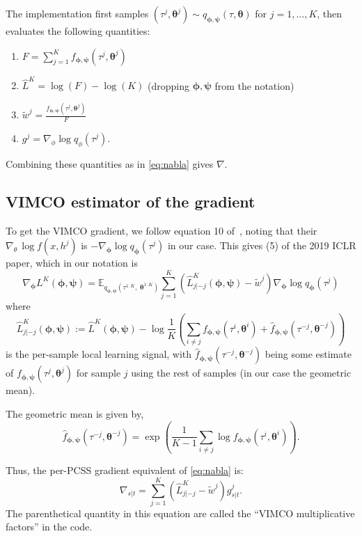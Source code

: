 \documentclass{article}
\newcommand{\bParam}{\bm{\theta}}
\begin{document}
The implementation first samples $(\tau^j, \bParam^j) \sim q_{\bm{\phi}, \bm{\psi}}(\tau, \bParam)$ for $j = 1, \ldots, K$, then evaluates the following quantities:
\begin{enumerate}
    \item $F = \sum_{j=1}^{K} f_{\bm{\phi},\bm{\psi}}(\tau^j, \bParam^j)$
    \item $\hat{L}^{K} = \log(F) - \log(K)$ (dropping $\bm{\phi}, \bm{\psi}$ from the notation)
    \item $\tilde{w}^j = \frac{f_{\bm{\phi},\bm{\psi}}(\tau^j, \bParam^j)}{F}$
    \item $g^j = \nabla_{\phi} \log q_{\phi}(\tau^j)$.
\end{enumerate}
Combining these quantities as in \eqref{eq:nabla} gives $\nabla$.

\subsection*{VIMCO estimator of the gradient}

To get the VIMCO gradient, we follow equation 10 of~\cite{Mnih2016-ec}, noting that their $\nabla_\theta \, \log f(x, h^j)$ is $-\nabla_{\bm{\phi}} \log q_{\bm{\phi}}(\tau^j)$ in our case.
This gives (5) of the 2019 ICLR paper, which in our notation is
\[
\nabla_{\bm{\phi}} L^K(\bm{\phi},{\bm{\psi}}) = \mathbb{E}_{q_{\bm{\phi},{\bm{\psi}}}(\tau^{1:K},\;\bm{\theta}^{1:K})}\sum_{j=1}^K\left(\hat{L}_{j|-j}^K(\bm{\phi},{\bm{\psi}})-\tilde{w}^j\right)\nabla_{\bm{\phi}}\log q_{\bm{\phi}}(\tau^j)
\]
where
\[
\hat{L}_{j|-j}^K(\bm{\phi},{\bm{\psi}}) :=  \hat{L}^K(\bm{\phi},{\bm{\psi}}) - \log\frac1K\left(\sum_{i\neq j}f_{\bm{\phi},{\bm{\psi}}}(\tau^i,\bm{\theta}^i) + \hat{f}_{\bm{\phi},{\bm{\psi}}}(\tau^{-j},\bm{\theta}^{-j})\right)
\]
is the per-sample local learning signal, with $\hat{f}_{\bm{\phi},{\bm{\psi}}}(\tau^{-j},\bm{\theta}^{-j})$ being some estimate of $f_{\bm{\phi},{\bm{\psi}}}(\tau^j,\bm{\theta}^j)$ for sample $j$ using the rest of samples (in our case the geometric mean).

The geometric mean is given by,
\begin{equation}\label{eq:f_hat}
    \hat{f}_{\bm{\phi}, \bm{\psi}}(\tau^{-j}, \bm{\theta}^{-j})  = \exp\left( \frac{1}{K-1} \sum_{i \not= j} \log f_{\bm{\phi}, \bm{\psi}}(\tau^i, \bm{\theta}^i) \right).
\end{equation}

Thus, the per-PCSS gradient equivalent of \eqref{eq:nabla} is:
\begin{equation}\label{eq:nablaVIMCO}
    \nabla_{s|t} = \sum\limits_{j=1}^{K} (\hat{L}_{j|-j}^K - \tilde{w}^j) g_{s|t}^j.
\end{equation}
The parenthetical quantity in this equation are called the ``VIMCO multiplicative factors'' in the code.
\end{document}
